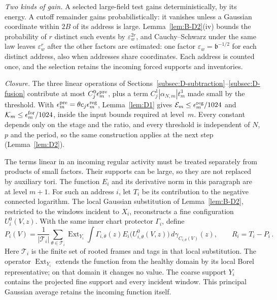 \emph{Two kinds of gain.} A selected large-field test gains deterministically, by its energy. A cutoff remainder gains probabilistically: it vanishes unless a Gaussian coordinate within $2B$ of its address is large. Lemma~\ref{lem:B-D2}(iv) bounds the probability of $r$ distinct such events by $\varepsilon_w^{2r}$, and Cauchy--Schwarz under the same law leaves $\varepsilon_w^r$ after the other factors are estimated: one factor $\varepsilon_w=\mathfrak b^{-1/2}$ for each distinct address, also when addresses share coordinates. Each address is counted once, and the selection retains the incoming forced supports and inventories.

\emph{Closure.} The three linear operations of Sections~\ref{subsec:D-subtraction}--\ref{subsec:D-fusion} contribute at most $C^0_j\epsilon^{\rm pre}_m$, plus a term $C^1_j|\alpha_{N,m}|t_m^3$ made small by the threshold. With $\epsilon^{\rm pre}_m=\theta c_j\epsilon^{\rm reg}_m$, Lemma~\ref{lem:D1} gives $\mathcal E_m\le\epsilon^{\rm reg}_m/1024$ and $\mathcal K_m\le\epsilon^{\rm for}_m/1024$, inside the input bounds required at level~$m$. Every constant depends only on the stage and the ratio, and every threshold is independent of $N$, $p$ and the period, so the same construction applies at the next step (Lemma~\ref{lem:D2}).

The terms linear in an incoming regular activity must be treated separately from products of small factors. Their supports can be large, so they are not replaced by auxiliary tori. The function $E_i$ and its derivative norm in this paragraph are at level $m+1$. For such an address $i$, let $T_i$ be its contribution to the negative connected logarithm. The local Gaussian substitution of Lemma~\ref{lem:B-D2}, restricted to the windows incident to $X_i$, reconstructs a fine configuration $U_i^0(V,z)$. With the same inner chart protector $\Gamma_i$, define
\begin{equation*}
P_i(V)=\frac1{|\mathcal T_i|}\sum_{\theta\in\mathcal T_i}
\operatorname{Ext}_{Y_i}\int\Gamma_{i,\theta}(z)
 E_i\bigl(U_{i,\theta}^0(V,z)\bigr)\,d\gamma_{C_{i,\theta}(V)}(z),
\qquad R_i=T_i-P_i\,.
\end{equation*}
Here $\mathcal T_i$ is the finite set of rooted frames and tags in that local substitution. The operator $\operatorname{Ext}_{Y_i}$ extends the function from the healthy domain by its local Borel representative; on that domain it changes no value. The coarse support $Y_i$ contains the projected fine support and every incident window. This principal Gaussian average retains the incoming function itself.


